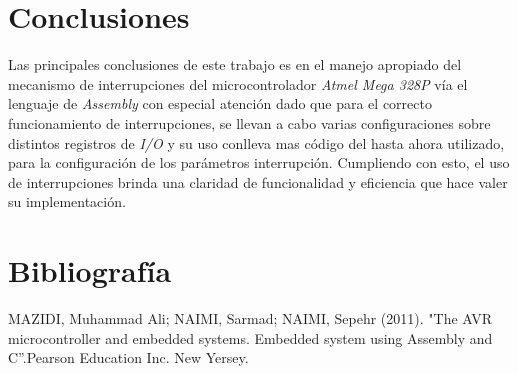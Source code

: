 \section{Conclusiones}
Las principales conclusiones de este trabajo es en el manejo apropiado del mecanismo de interrupciones del microcontrolador \textit{Atmel Mega 328P} vía el lenguaje de \textit{Assembly} con especial atención dado que para el correcto funcionamiento de interrupciones, se llevan a cabo varias configuraciones sobre distintos registros de \textit{I/O} y su uso conlleva mas código del hasta ahora utilizado, para la configuración de los parámetros interrupción.
Cumpliendo con esto, el uso de interrupciones brinda una claridad de funcionalidad y eficiencia que hace valer su implementación.

\section*{Bibliografía}
MAZIDI, Muhammad Ali; NAIMI, Sarmad; NAIMI, Sepehr (2011). "The AVR microcontroller and embedded systems. Embedded system using Assembly and C”.Pearson Education Inc. New Yersey.

\pagebreak



